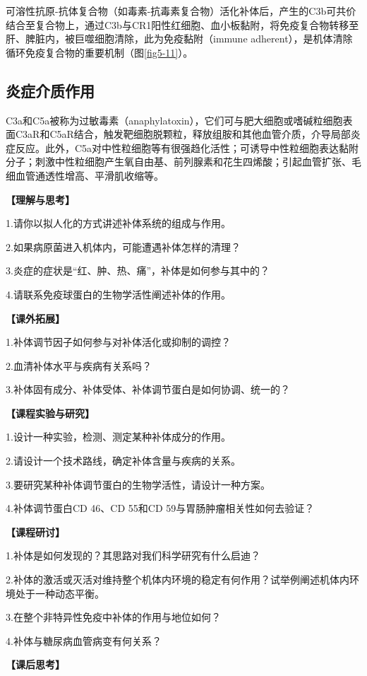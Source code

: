 可溶性抗原-抗体复合物（如毒素-抗毒素复合物）活化补体后，产生的C3b可共价结合至复合物上，通过C3b与CR1阳性红细胞、血小板黏附，将免疫复合物转移至肝、脾脏内，被巨噬细胞清除，此为免疫黏附（immune
adherent），是机体清除循环免疫复合物的重要机制（图\ref{fig5-11}）。


\subsection{炎症介质作用}

C3a和C5a被称为过敏毒素（anaphylatoxin），它们可与肥大细胞或嗜碱粒细胞表面C3aR和C5aR结合，触发靶细胞脱颗粒，释放组胺和其他血管介质，介导局部炎症反应。此外，C5a对中性粒细胞等有很强趋化活性；可诱导中性粒细胞表达黏附分子；刺激中性粒细胞产生氧自由基、前列腺素和花生四烯酸；引起血管扩张、毛细血管通透性增高、平滑肌收缩等。

\noindent\textbf{【理解与思考】}

1.请你以拟人化的方式讲述补体系统的组成与作用。

2.如果病原菌进入机体内，可能遭遇补体怎样的清理？

3.炎症的症状是“红、肿、热、痛”，补体是如何参与其中的？

4.请联系免疫球蛋白的生物学活性阐述补体的作用。

\noindent\textbf{【课外拓展】}

1.补体调节因子如何参与对补体活化或抑制的调控？

2.血清补体水平与疾病有关系吗？

3.补体固有成分、补体受体、补体调节蛋白是如何协调、统一的？

\noindent\textbf{【课程实验与研究】}

1.设计一种实验，检测、测定某种补体成分的作用。

2.请设计一个技术路线，确定补体含量与疾病的关系。

3.要研究某种补体调节蛋白的生物学活性，请设计一种方案。

4.补体调节蛋白CD 46、CD 55和CD 59与胃肠肿瘤相关性如何去验证？

\noindent\textbf{【课程研讨】}

1.补体是如何发现的？其思路对我们科学研究有什么启迪？

2.补体的激活或灭活对维持整个机体内环境的稳定有何作用？试举例阐述机体内环境处于一种动态平衡。

3.在整个非特异性免疫中补体的作用与地位如何？

4.补体与糖尿病血管病变有何关系？

\noindent\textbf{【课后思考】}

